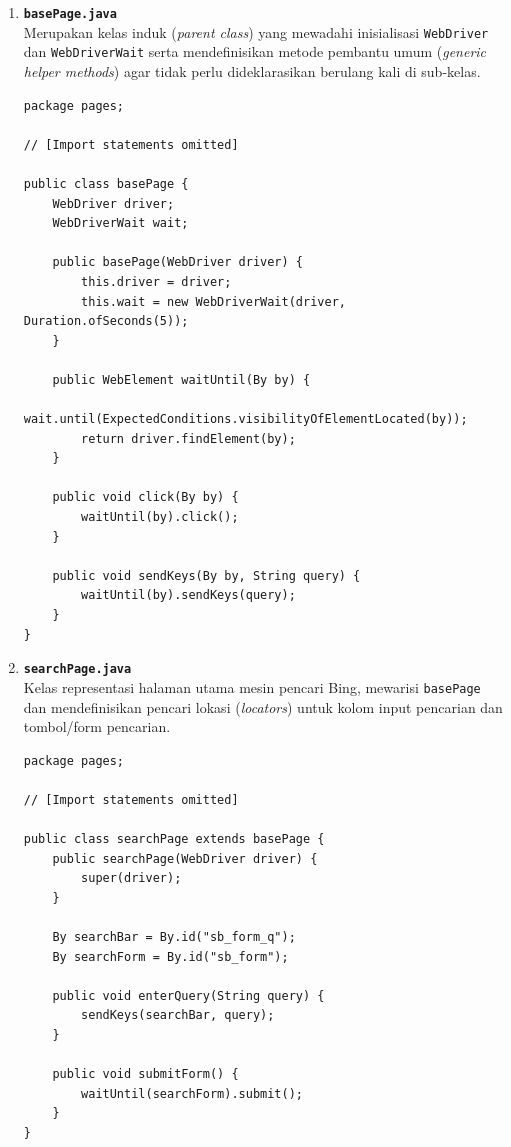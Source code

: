 \documentclass[a4paper,oneside,12pt]{report}
\begin{document}
\begin{enumerate}
    \item \textbf{\texttt{basePage.java}} \\
          Merupakan kelas induk (\textit{parent class}) yang mewadahi inisialisasi \texttt{WebDriver} dan \texttt{WebDriverWait} serta mendefinisikan metode pembantu umum (\textit{generic helper methods}) agar tidak perlu dideklarasikan berulang kali di sub-kelas.
          \begin{lstlisting}[style=javastyle, caption={Implementasi Kelas basePage.java}]
package pages;

// [Import statements omitted]

public class basePage {
    WebDriver driver;
    WebDriverWait wait;

    public basePage(WebDriver driver) {
        this.driver = driver;
        this.wait = new WebDriverWait(driver, Duration.ofSeconds(5));
    }

    public WebElement waitUntil(By by) {
        wait.until(ExpectedConditions.visibilityOfElementLocated(by));
        return driver.findElement(by);
    }

    public void click(By by) {
        waitUntil(by).click();
    }

    public void sendKeys(By by, String query) {
        waitUntil(by).sendKeys(query);
    }
}
\end{lstlisting}

    \item \textbf{\texttt{searchPage.java}} \\
          Kelas representasi halaman utama mesin pencari Bing, mewarisi \texttt{basePage} dan mendefinisikan pencari lokasi (\textit{locators}) untuk kolom input pencarian dan tombol/form pencarian.
          \begin{lstlisting}[style=javastyle, caption={Implementasi Kelas searchPage.java}]
package pages;

// [Import statements omitted]

public class searchPage extends basePage {
    public searchPage(WebDriver driver) {
        super(driver);
    }

    By searchBar = By.id("sb_form_q");
    By searchForm = By.id("sb_form");

    public void enterQuery(String query) {
        sendKeys(searchBar, query);
    }

    public void submitForm() {
        waitUntil(searchForm).submit();
    }
}
\end{lstlisting}


\end{enumerate}
\end{document}
